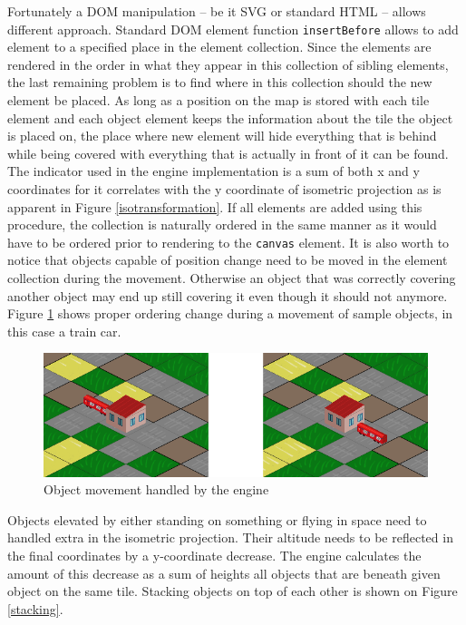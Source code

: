 \documentclass[11pt,oneside, final]{fithesis2}
\begin{document}
Fortunately a DOM manipulation -- be it SVG or standard HTML -- allows different approach. Standard DOM element function \texttt{insertBefore} allows to add element to a specified place in the element collection\cite{insertbefore}. Since the elements are rendered in the order in what they appear in this collection of sibling elements, the last remaining problem is to find where in this collection should the new element be placed. As long as a position on the map is stored with each tile element and each object element keeps the information about the tile the object is placed on, the place where new element will hide everything that is behind while being covered with everything that is actually in front of it can be found. The indicator used in the engine implementation is a sum of both x and y coordinates for it correlates with the y coordinate of isometric projection as is apparent in Figure \ref{isotransformation}. If all elements are added using this procedure, the collection is naturally ordered in the same manner as it would have to be ordered prior to rendering to the \texttt{canvas} element. It is also worth to notice that objects capable of position change need to be moved in the element collection during the movement. Otherwise an object that was correctly covering another object may end up still covering it even though it should not anymore. Figure \ref{movement} shows proper ordering change during a movement of sample objects, in this case a train car.

\begin{figure}[h]
	\centering
	\includegraphics[width=\textwidth]{thesis-movement}
	\caption{Object movement handled by the engine}
	\label{movement}
\end{figure}

Objects elevated by either standing on something or flying in space need to handled extra in the isometric projection. Their altitude needs to be reflected in the final coordinates by a y-coordinate decrease. The engine calculates the amount of this decrease as a sum of heights all objects that are beneath given object on the same tile. Stacking objects on top of each other is shown on Figure \ref{stacking}.
\end{document}
